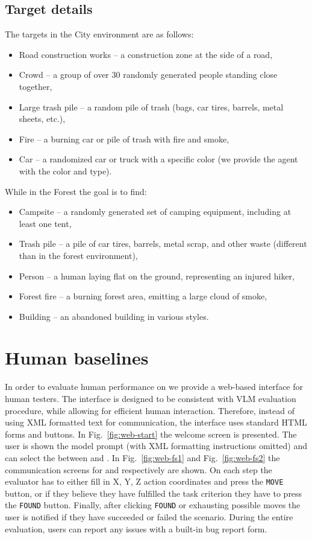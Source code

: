 \subsection{Target details}
The targets in the City environment are as follows:
\begin{itemize}
    \item Road construction works -- a construction zone at the side of a road,
    \item Crowd -- a group of over 30 randomly generated people standing close together,
    \item Large trash pile -- a random pile of trash (bags, car tires, barrels, metal sheets, etc.),
    \item Fire -- a burning car or pile of trash with fire and smoke,
    \item Car -- a randomized car or truck with a specific color (we provide the agent with the color and type).
\end{itemize}
While in the Forest the goal is to find:
\begin{itemize}
    \item Campsite -- a randomly generated set of camping equipment, including at least one tent,
    \item Trash pile -- a pile of car tires, barrels, metal scrap, and other waste (different than in the forest environment),
    \item Person -- a human laying flat on the ground, representing an injured hiker,
    \item Forest fire -- a burning forest area, emitting a large cloud of smoke,
    \item Building -- an abandoned building in various styles.
\end{itemize}


\section{Human baselines}
\label{app:human_baseline}
In order to evaluate human performance on \ours{} we provide a web-based interface for human testers. The interface is designed to be consistent with VLM evaluation procedure, while allowing for efficient human interaction. Therefore, instead of using XML formatted text for communication, the interface uses standard HTML forms and buttons. In Fig.~\ref{fig:web-start} the welcome screen is presented. The user is shown the model prompt (with XML formatting instructions omitted) and can select the between \challenge{} and \hardchallenge{}. In Fig.~\ref{fig:web-fs1} and Fig.~\ref{fig:web-fs2} the communication screens for \challenge{} and \hardchallenge{} respectively are shown. On each step the evaluator has to either fill in X, Y, Z action coordinates and press the \texttt{MOVE} button, or if they believe they have fulfilled the task criterion they have to press the \texttt{FOUND} button. Finally, after clicking \texttt{FOUND} or exhausting possible moves the user is notified if they have succeeded or failed the scenario. During the entire evaluation, users can report any issues with a built-in bug report form. 

